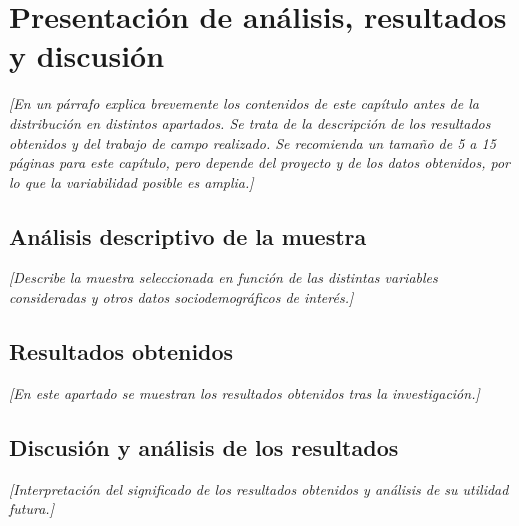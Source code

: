 
\chapter{Presentación de análisis, resultados y discusión}

\label{Chapter5}


\textit{[En un párrafo explica brevemente los contenidos de este capítulo antes de la distribución en distintos apartados. Se trata de la descripción de los resultados obtenidos y del trabajo de campo realizado. Se recomienda un tamaño de 5 a 15 páginas para este capítulo, pero depende del proyecto y de los datos obtenidos, por lo que la variabilidad posible es amplia.]}


\section{Análisis descriptivo de la muestra}

\textit{[Describe la muestra seleccionada en función de las distintas variables consideradas y otros datos sociodemográficos de interés.]}


\section{Resultados obtenidos}

\textit{[En este apartado se muestran los resultados obtenidos tras la investigación.]}


\section{Discusión y análisis de los resultados}

\textit{[Interpretación del significado de los resultados obtenidos y análisis de su utilidad futura.]}
